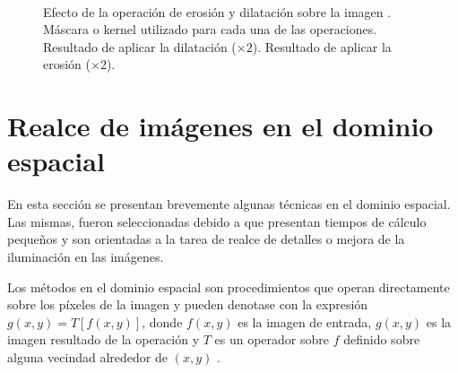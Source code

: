 % 
\begin{figure}[tbhp]
\centering
{}  \qquad
{}\\
\caption[Efecto de la operación de erosión y dilatación sobre una imagen]{Efecto de la operación de erosión y dilatación sobre la imagen .  Máscara o kernel utilizado para cada una de las operaciones.  Resultado de aplicar la dilatación ($\times2$).  Resultado de aplicar la erosión ($\times2$).
}
\end{figure}
\section{Realce de imágenes en el dominio espacial}
\label{subsec:mejoras_iluminacion}
En esta sección se presentan brevemente algunas técnicas en el dominio espacial. Las mismas, fueron seleccionadas debido a que presentan tiempos de cálculo pequeños y son orientadas a la tarea de realce de detalles o mejora de la iluminación en las imágenes.

Los métodos en el dominio espacial son procedimientos que operan directamente sobre los píxeles de la imagen y pueden denotase con la expresión $g(x,y)=T[f(x,y)]$, donde $f(x,y)$ es la imagen de entrada, $g(x,y)$ es la imagen resultado de la operación y $T$ es un operador sobre $f$ definido sobre alguna vecindad alrededor de $(x,y)$ \cite{Gonzalez:02}. 

